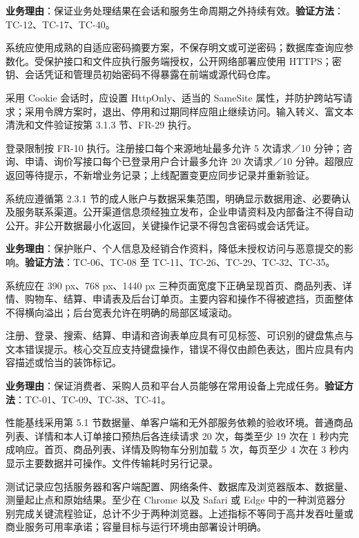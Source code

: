 {\bfseries 业务理由}：保证业务处理结果在会话和服务生命周期之外持续有效。{\bfseries 验证方法}：TC-12、TC-17、TC-40。


系统应使用成熟的自适应密码摘要方案，不保存明文或可逆密码；数据库查询应参数化。受保护接口和文件应执行服务端授权，公开网络部署应使用 HTTPS；密钥、会话凭证和管理员初始密码不得暴露在前端或源代码仓库。

采用 Cookie 会话时，应设置 HttpOnly、适当的 SameSite 属性，并防护跨站写请求；采用令牌方案时，退出、停用和过期同样应阻止继续访问。输入转义、富文本清洗和文件验证按第 3.1.3 节、FR-29 执行。

登录限制按 FR-10 执行。注册接口每个来源地址最多允许 5 次请求／10 分钟；咨询、申请、询价写接口每个已登录用户合计最多允许 20 次请求／10 分钟。超限应返回等待提示，不新增业务记录；上线配置变更应同步记录并重新验证。

系统应遵循第 2.3.1 节的成人账户与数据采集范围，明确显示数据用途、必要确认及服务联系渠道。公开渠道信息须经独立发布，企业申请资料及内部备注不得自动公开。非公开数据最小化返回，关键操作记录不得包含密码或会话凭证。

{\bfseries 业务理由}：保护账户、个人信息及经销合作资料，降低未授权访问与恶意提交的影响。{\bfseries 验证方法}：TC-06、TC-08 至 TC-11、TC-26、TC-29、TC-32、TC-35。


系统应在 390 px、768 px、1440 px 三种页面宽度下正确呈现首页、商品列表、详情、购物车、结算、申请表及后台订单页。主要内容和操作不得被遮挡，页面整体不得横向溢出；后台宽表允许在明确的局部区域滚动。

注册、登录、搜索、结算、申请和咨询表单应具有可见标签、可识别的键盘焦点与文本错误提示。核心交互应支持键盘操作，错误不得仅由颜色表达，图片应具有内容描述或恰当的装饰标记。

{\bfseries 业务理由}：保证消费者、采购人员和平台人员能够在常用设备上完成任务。{\bfseries 验证方法}：TC-01、TC-09、TC-38、TC-41。


性能基线采用第 5.1 节数据量、单客户端和无外部服务依赖的验收环境。普通商品列表、详情和本人订单接口预热后各连续请求 20 次，每类至少 19 次在 1 秒内完成响应。首页、商品列表、详情及购物车分别加载 5 次，每页至少 4 次在 3 秒内显示主要数据并可操作。文件传输耗时另行记录。

测试记录应包括服务器和客户端配置、网络条件、数据库及浏览器版本、数据量、测量起止点和原始结果。至少在 Chrome 以及 Safari 或 Edge 中的一种浏览器分别完成关键流程验证，总计不少于两种浏览器。上述指标不等同于高并发吞吐量或商业服务可用率承诺；容量目标与运行环境由部署设计明确。

